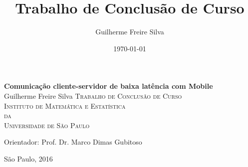 \documentclass[a4paper,12pt]{article}
\title{Trabalho de Conclusão de Curso}
\author{Guilherme Freire Silva}
\date{\today}
\begin{document}

\thispagestyle{empty}
\begin{center}
    \vspace*{2.3cm}
    \textbf{\Large{Comunicação cliente-servidor de baixa latência com Mobile}}\\


    \vspace*{1.2cm}
    \Large{
        Guilherme Freire Silva
    }
    \vskip 2cm
    \textsc{
     Trabalho de Conclusão de Curso \\[-0.25cm]
    Instituto de Matemática e Estatística\\[-0.25cm]
    da\\[-0.25cm]
    Universidade de São Paulo\\[-0.25cm]%
    }

    \vskip 2.5cm
    Orientador: Prof. Dr. Marco Dimas Gubitoso

    \vskip 3.5cm
    \normalsize{São Paulo, 2016}
\end{center}

\newpage
% 

\newpage
\listoffigures
\listoftables
\tableofcontents

% 

\newpage %

\renewcommand{\arraystretch}{1.2}

% 
% 
% 
% 
% 
% 
% 
% 


\newpage
\end{document}
